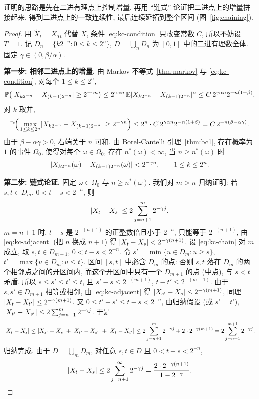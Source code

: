 证明的思路是先在二进有理点上控制增量, 再用 ``链式'' 论证把二进点上的增量拼接起来, 得到二进点上的一致连续性, 最后连续延拓到整个区间 (图~\ref{fig:chaining}).

\begin{proof}
用 $\widetilde{X}_t=X_{Tt}$ 代替 $X$, 条件 \eqref{eq:kc-condition} 只改变常数 $C$, 所以不妨设 $T=1$. 记 $D_n=\{k2^{-n}: 0\le k\le2^n\}$, $D=\bigcup_nD_n$ 为 $[0,1]$ 中的二进有理数全体. 固定 $\gamma\in(0,\beta/\alpha)$.

\textbf{第一步: 相邻二进点上的增量.} 由 Markov 不等式~\ref{thm:markov} 与 \eqref{eq:kc-condition}, 对每个 $1\le k\le2^n$,
\[
\mathbb{P}\big(\lvert X_{k2^{-n}}-X_{(k-1)2^{-n}}\rvert\ge2^{-\gamma n}\big)\le2^{\gamma\alpha n}\,\mathbb{E}\lvert X_{k2^{-n}}-X_{(k-1)2^{-n}}\rvert^\alpha\le C\,2^{\gamma\alpha n}2^{-n(1+\beta)}.
\]
对 $k$ 取并,
\[
\mathbb{P}\Big(\max_{1\le k\le2^n}\lvert X_{k2^{-n}}-X_{(k-1)2^{-n}}\rvert\ge2^{-\gamma n}\Big)\le2^n\cdot C\,2^{\gamma\alpha n}2^{-n(1+\beta)}=C\,2^{-n(\beta-\alpha\gamma)}.
\]
由于 $\beta-\alpha\gamma>0$, 右端关于 $n$ 可和. 由 Borel-Cantelli 引理~\ref{thm:bc1}, 存在概率为 $1$ 的事件 $\Omega_0$, 使得对每个 $\omega\in\Omega_0$, 存在 $n^*(\omega)<\infty$, 当 $n\ge n^*(\omega)$ 时
\begin{equation}\label{eq:kc-adjacent}
\lvert X_{k2^{-n}}(\omega)-X_{(k-1)2^{-n}}(\omega)\rvert<2^{-\gamma n},\qquad 1\le k\le2^n.
\end{equation}

\textbf{第二步: 链式论证.} 固定 $\omega\in\Omega_0$ 与 $n\ge n^*(\omega)$. 我们对 $m>n$ 归纳证明: 若 $s,t\in D_m$, $0<t-s<2^{-n}$, 则
\begin{equation}\label{eq:kc-chain}
\lvert X_t-X_s\rvert\le2\sum_{j=n+1}^m2^{-\gamma j}.
\end{equation}
$m=n+1$ 时, $t-s$ 是 $2^{-(n+1)}$ 的正整数倍且小于 $2^{-n}$, 只能等于 $2^{-(n+1)}$, 由 \eqref{eq:kc-adjacent} (把 $n$ 换成 $n+1$) 得 $\lvert X_t-X_s\rvert<2^{-\gamma(n+1)}$. 设 \eqref{eq:kc-chain} 对 $m$ 成立, 取 $s,t\in D_{m+1}$, $0<t-s<2^{-n}$. 令 $s'=\min\{u\in D_m: u\ge s\}$, $t'=\max\{u\in D_m: u\le t\}$. 区间 $[s,t]$ 中必含 $D_m$ 的点: 否则 $s,t$ 落在 $D_m$ 的两个相邻点之间的开区间内, 而这个开区间中只有一个 $D_{m+1}$ 的点 (中点), 与 $s<t$ 矛盾. 所以 $s\le s'\le t'\le t$, 且 $s'-s\le2^{-(m+1)}$, $t-t'\le2^{-(m+1)}$. 由于 $s,s'\in D_{m+1}$ 相等或相邻, 由 \eqref{eq:kc-adjacent} 得 $\lvert X_{s'}-X_s\rvert\le2^{-\gamma(m+1)}$, 同理 $\lvert X_t-X_{t'}\rvert\le2^{-\gamma(m+1)}$. 又 $0\le t'-s'\le t-s<2^{-n}$, 由归纳假设 (或 $s'=t'$), $\lvert X_{t'}-X_{s'}\rvert\le2\sum_{j=n+1}^m2^{-\gamma j}$. 于是
\[
\lvert X_t-X_s\rvert\le\lvert X_{s'}-X_s\rvert+\lvert X_{t'}-X_{s'}\rvert+\lvert X_t-X_{t'}\rvert\le2\sum_{j=n+1}^m2^{-\gamma j}+2\cdot2^{-\gamma(m+1)}=2\sum_{j=n+1}^{m+1}2^{-\gamma j}.
\]
归纳完成. 由于 $D=\bigcup_mD_m$, 对任意 $s,t\in D$ 且 $0<t-s<2^{-n}$,
\[
\lvert X_t-X_s\rvert\le2\sum_{j=n+1}^\infty2^{-\gamma j}=\frac{2\cdot2^{-\gamma(n+1)}}{1-2^{-\gamma}}.
\]


\end{proof}
